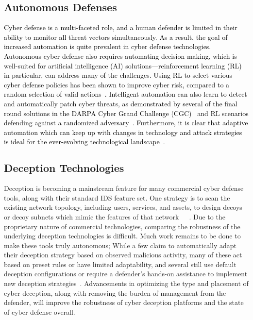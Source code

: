 \documentclass{article}
\newcommand\kjf[1]{\textcolor{black}{#1}}
\newcommand\nnn[1]{\textcolor{black}{#1}}
\begin{document}
\subsection{Autonomous Defenses}
\nnn{Cyber defense is a multi-faceted role, and a human defender is limited in their ability to monitor all threat vectors simultaneously. As a result, \kjf{the goal of increased} automation is quite prevalent in cyber defense technologies. Autonomous cyber defense \kjf{also requires automating decision making, which is well-suited for artificial intelligence (AI) solutions}---reinforcement learning (RL) in particular, can address many of the challenges. Using RL to select various cyber defense policies has been shown to improve cyber risk, compared to a random selection of valid actions~\cite{beaudoin2009}. Intelligent automation can also learn to detect and automatically patch cyber threats, as demonstrated by several of the final round solutions in the DARPA Cyber Grand Challenge (CGC)~\cite{darpa2015} and RL scenarios defending against a randomized adversary~\cite{ridley2018}. \kjf{Furthermore, it is clear that} adaptive automation which can keep up with changes in technology and attack strategies is ideal for the ever-evolving technological landscape~\cite{crawford2017}. }


\subsection{Deception Technologies}
Deception is becoming a mainstream feature for many commercial cyber defense tools, along with their standard IDS feature set. One strategy is to scan the existing network topology, including users, services, and assets, to design decoys or decoy subnets which mimic the features of that network~\cite{fidelis2021}~\cite{cybertrap2021}~\cite{smokescreen2021}. Due to the proprietary nature of commercial technologies, comparing the robustness of the underlying deception technologies is difficult. Much work remains to be done to make these tools truly autonomous; While a few claim to automatically adapt their deception strategy based on observed malicious activity, many of these act based on preset rules or have limited adaptability, and several still use default deception configurations or require a defender's hands-on assistance to implement new deception strategies~\cite{trapxsecurity2017}. Advancements in optimizing the type and placement of cyber deception, along with removing the burden of management from the defender, will improve the robustness of cyber deception platforms and the state of cyber defense overall.
\end{document}
